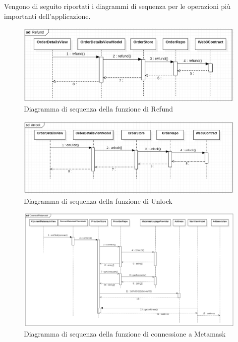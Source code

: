 Vengono di seguito riportati i diagrammi di sequenza per le operazioni più importanti dell'applicazione.

\begin{figure}[H]
    \begin{center}
    \includegraphics[width=\textwidth]{immagini/refund.png}
    \caption{Diagramma di sequenza della funzione di Refund}
    \end{center}
\end{figure}

\begin{figure}[H]
    \begin{center}
    \includegraphics[width=\textwidth]{immagini/unlock.png}
    \caption{Diagramma di sequenza della funzione di Unlock}
    \end{center}
\end{figure}

\begin{landscape}
    \begin{figure}[H]
        \begin{center}
        \includegraphics[scale=0.7]{immagini/metamask.png}
        \caption{Diagramma di sequenza della funzione di connessione a Metamask}
        \end{center}
    \end{figure}
\end{landscape}

